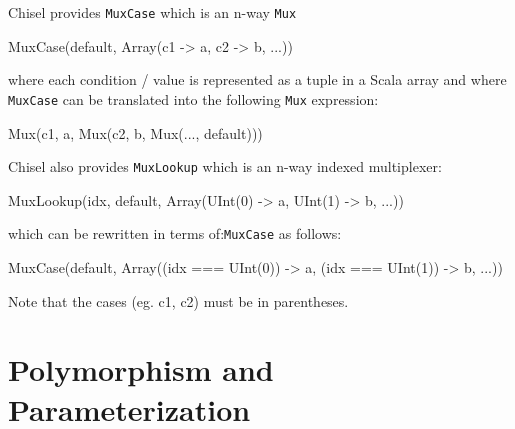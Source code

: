\documentclass[twocolumn,10pt]{article}
\def\code#1{{\tt #1}}
\begin{document}
Chisel provides \code{MuxCase} which is an n-way \code{Mux} 
\begin{scala}
MuxCase(default, Array(c1 -> a, c2 -> b, ...))
\end{scala}
 
\noindent
where each condition / value is represented as a tuple in a Scala
array and where \code{MuxCase} can be translated into the following
\code{Mux} expression:

\begin{scala}
Mux(c1, a, Mux(c2, b, Mux(..., default)))
\end{scala}

\noindent
Chisel also provides \code{MuxLookup} which is an n-way indexed multiplexer:

\begin{scala}
MuxLookup(idx, default, 
          Array(UInt(0) -> a, UInt(1) -> b, ...))
\end{scala}

\noindent
which can be rewritten in terms of:\verb+MuxCase+ as follows:

\begin{scala}
MuxCase(default, 
        Array((idx === UInt(0)) -> a, 
              (idx === UInt(1)) -> b, ...))
\end{scala}

\noindent
Note that the cases (eg. c1, c2) must be in parentheses.



%
%




\section{Polymorphism and Parameterization}
\label{sec:parameterization}
\end{document}
